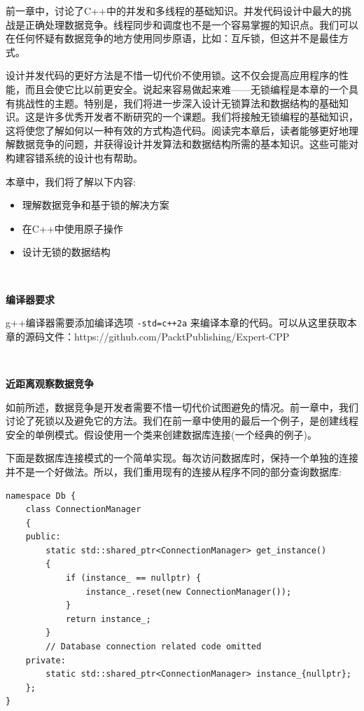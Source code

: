 前一章中，讨论了C++中的并发和多线程的基础知识。并发代码设计中最大的挑战是正确处理数据竞争。线程同步和调度也不是一个容易掌握的知识点。我们可以在任何怀疑有数据竞争的地方使用同步原语，比如：互斥锁，但这并不是最佳方式。 \par
设计并发代码的更好方法是不惜一切代价不使用锁。这不仅会提高应用程序的性能，而且会使它比以前更安全。说起来容易做起来难——无锁编程是本章的一个具有挑战性的主题。特别是，我们将进一步深入设计无锁算法和数据结构的基础知识。这是许多优秀开发者不断研究的一个课题。我们将接触无锁编程的基础知识，这将使您了解如何以一种有效的方式构造代码。阅读完本章后，读者能够更好地理解数据竞争的问题，并获得设计并发算法和数据结构所需的基本知识。这些可能对构建容错系统的设计也有帮助。 \par
本章中，我们将了解以下内容: \par

\begin{itemize}
	\item 理解数据竞争和基于锁的解决方案
	\item 在C++中使用原子操作
	\item 设计无锁的数据结构
\end{itemize}

\noindent\textbf{}\ \par
\textbf{编译器要求} \ \par
g++编译器需要添加编译选项 \texttt{-std=c++2a} 来编译本章的代码。可以从这里获取本章的源码文件：https:/​/github.​com/PacktPublishing/Expert-CPP \par

\noindent\textbf{}\ \par
\textbf{近距离观察数据竞争} \ \par
如前所述，数据竞争是开发者需要不惜一切代价试图避免的情况。前一章中，我们讨论了死锁以及避免它的方法。我们在前一章中使用的最后一个例子，是创建线程安全的单例模式。假设使用一个类来创建数据库连接(一个经典的例子)。 \par
下面是数据库连接模式的一个简单实现。每次访问数据库时，保持一个单独的连接并不是一个好做法。所以，我们重用现有的连接从程序不同的部分查询数据库: \par

\begin{lstlisting}[caption={}]
namespace Db {
	class ConnectionManager
	{
	public:
		static std::shared_ptr<ConnectionManager> get_instance()
		{
			if (instance_ == nullptr) {
				instance_.reset(new ConnectionManager());
			}
			return instance_;
		}
		// Database connection related code omitted
	private:
		static std::shared_ptr<ConnectionManager> instance_{nullptr};
	};
}
\end{lstlisting}

